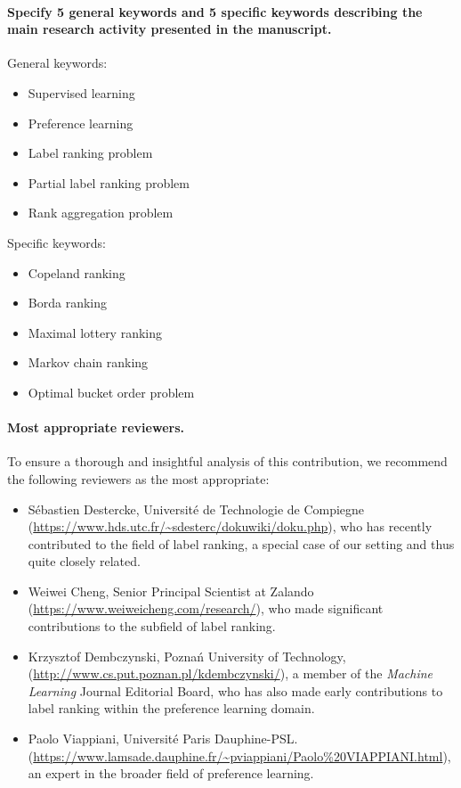 \documentclass[pdflatex, sn-apa]{sn-jnl}
\begin{document}
\paragraph{Specify 5 general keywords and 5 specific keywords describing the main research activity presented in the manuscript.}
%
%
General keywords:
%
\begin{itemize}
    \item Supervised learning
    \item Preference learning
    \item Label ranking problem 
    \item Partial label ranking problem
    \item Rank aggregation problem
\end{itemize}
%
Specific keywords:
%
\begin{itemize}
    \item Copeland ranking
    \item Borda ranking
    \item Maximal lottery ranking
    \item Markov chain ranking
    \item Optimal bucket order problem 
\end{itemize}

\paragraph{Most appropriate reviewers.}
%
%
To ensure a thorough and insightful analysis of this contribution, we recommend the following reviewers as the most appropriate:
%
\begin{itemize}
	\item Sébastien Destercke, Université de Technologie de Compiegne  (\url{https://www.hds.utc.fr/~sdesterc/dokuwiki/doku.php}), who has recently contributed to the field of label ranking, a special case of our setting and thus quite closely related.
    \item Weiwei Cheng, Senior Principal Scientist at Zalando (\url{https://www.weiweicheng.com/research/}), who made significant contributions to the subfield of label ranking.
    \item Krzysztof Dembczynski, Poznań University of Technology, (\url{http://www.cs.put.poznan.pl/kdembczynski/}), a member of the \textit{Machine Learning} Journal Editorial Board, who has also made early contributions to label ranking within the preference learning domain.
	\item Paolo Viappiani, Université Paris Dauphine-PSL. (\url{https://www.lamsade.dauphine.fr/~pviappiani/Paolo%20VIAPPIANI.html}), an expert in the broader field of preference learning.
%	
\end{itemize}
%
%
\end{document}
